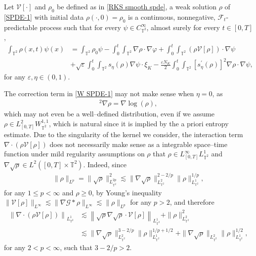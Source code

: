 
\begin{defi}\label{W SPDE-1}
Let $\mathcal{V}[\cdot]$ and $\rho_0$ be defined as in \ref{RKS smooth spde}, a weak solution  $\rho$ of \eqref{SPDE-1} with initial data $\rho(\cdot, 0)=\rho_0$ is a continuous, nonnegative, $\mathcal{F}_{t}$-predictable process such that for every $\psi \in C^{\infty}_{\mathbb{T}^2}$, almost surely for every $t \in[0, T]$,
\begin{align}
\int_{\mathbb{T}^2} \rho(x, t) \psi(x) & =\int_{\mathbb{T}^2} \rho_0 \psi-\int_{0}^{t} \int_{\mathbb{T}^2} \nabla \rho \cdot \nabla \varphi+\int_{0}^{t} \int_{\mathbb{T}^2}(\rho \mathcal{V}[\rho]) \cdot \nabla \psi \nonumber\\
&+\sqrt{\varepsilon}\int_{0}^{t} \int_{\mathbb{T}^2} s_{\eta}(\rho) \nabla \psi \cdot \xi_{K}-\frac{\varepsilon N_{K}}{2} \int_{0}^{t} \int_{\mathbb{T}^2} \left[s_{\eta}^{\prime}(\rho)\right]^{2} \nabla \rho \cdot \nabla \psi,
\end{align}
for any $\varepsilon,\eta \in(0,1)$.
\end{defi}

The correction term in \eqref{W SPDE-1} may not make sense when $\eta = 0$, as 
\begin{align*}
[s_{\eta}^{\prime}(\rho)]^{2} \nabla \rho = \nabla \log(\rho),
\end{align*}
which may not even be a well--defined distribution, even if we assume $\rho \in L^2_{[0,T]}W^{1,1}_{\mathbb{T}^2}$, which is natural since it is implied by the a priori entropy estimate. Due to the singularity of the kernel we consider, the interaction term $\nabla\cdot(\rho \mathcal{V}[\rho])$ does not necessarily make sense as a integrable space--time function under mild regularity assumptions on $\rho$ that $\rho \in L^{\infty}_{[0,T]}L^1_{\mathbb{T}^2}$ and $\nabla \sqrt{\rho} \in L^{2}([0,T] \times \mathbb{T}^2)$. Indeed, since 
\begin{align*}
\|\rho\|_{L^p} = \|\sqrt{\rho}\|^2_{L_{\mathbb{T}^2}^{2p}} \lesssim \|\nabla\sqrt{\rho}\|^{2 -2/p}_{L_{\mathbb{T}^2}^{2}}\|\rho\|^{1/p}_{L^1_{\mathbb{T}^2}},
\end{align*}
for any $1\leq p<\infty$ and $\rho \geq 0$, by Young's inequality $\|\mathcal{V}[\rho]\|_{L^{\infty}} \lesssim \|\nabla \mathcal{G} \ast \rho\|_{L^{\infty}} \lesssim \|\rho\|_{L^p}$ for any $p>2$, and therefore
%
\begin{align}\label{eq:interaction is L1}
 \left\|\nabla\cdot \left(\rho \mathcal{V}[\rho]\right)\right\|_{L^1_{\mathbb{T}^2}} & \lesssim \left\|\sqrt{\rho} \nabla\sqrt{\rho} \cdot \mathcal{V}[\rho]\right\|_{L^1_{\mathbb{T}^2}} + \|\rho\|^2_{L^2_{\mathbb{T}^2}} \nonumber \\
 & \lesssim \|\nabla \sqrt{\rho}\|^{3 -2/p}_{L^2_{\mathbb{T}^2}}\|\rho\|^{1/p + 1/2}_{L^1_{\mathbb{T}^2}} + \|\nabla\sqrt{\rho}\|_{L_{\mathbb{T}^2}^{2}}\|\rho\|^{1/2}_{L^1_{\mathbb{T}^2}},
\end{align}
for any $2<p<\infty$, such that $3 -2/p > 2$. \\

